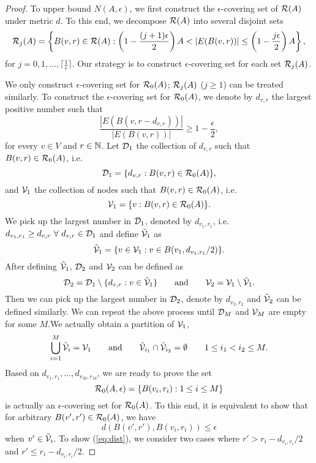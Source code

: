 \begin{proof}
	To upper bound $N(A,\epsilon)$, we first construct the $\epsilon$-covering set of $\mathcal{R}(A)$ under metric $d$.
	To this end, we decompose $\mathcal{R}(A)$ into several disjoint sets 
	$$
	\cR_j(A)=\left\{B(v,r)\in \cR(A): \left(1-\frac{(j+1)\epsilon}{2}\right)A<|E(B(v,r))|\le \left(1-\frac{j\epsilon}{2}\right)A\right\} ,
	$$
	for $j=0,1,\ldots, \lceil\frac{1}{\epsilon}\rceil$. Our strategy is to construct $\epsilon$-covering set for each set $\mathcal{R}_j(A)$. 
	
	We only construct $\epsilon$-covering set for $\mathcal{R}_0(A)$; $\mathcal{R}_j(A)$ ($j\ge 1$) can be treated similarly.
	To construct the $\epsilon$-covering set for $\mathcal{R}_0(A)$, we denote by $d_{v,r}$ the largest positive number such that
	\begin{equation}
	\label{eq:d}
	\frac{|E(B(v,r-d_{v,r}))|}{|E(B(v,r))|}\ge 1-\frac{\epsilon}{2},
	\end{equation}
	for every $v\in V$ and $r\in \mathbb{N}$. Let $\mathcal{D}_{1}$ the collection of $d_{v,r}$ such that $B(v,r)\in \mathcal{R}_0(A)$, i.e.
	$$
	\mathcal{D}_{1}=\{d_{v,r}:B(v,r)\in \mathcal{R}_0(A)\},
	$$
	and $\mathcal{V}_{1}$ the collection of nodes such that $B(v,r)\in \mathcal{R}_0(A)$, i.e. 
	$$
	\mathcal{V}_1=\{v:B(v,r)\in \mathcal{R}_0(A)\}.
	$$
	We pick up the largest number in $\mathcal{D}_1$, denoted by $d_{v_1,r_1}$, i.e. $
	d_{v_1,r_1}\ge d_{v,r}\ \forall\ d_{v,r}\in \cD_1$
	and define $\tilde{\mathcal{V}}_{1}$  as
	$$
	\tilde{\mathcal{V}}_{1}=\{v\in \mathcal{V}_1:v\in B(v_1,d_{v_1,r_1}/2)\}.
	$$
	After defining $\tilde{\mathcal{V}}_{1}$, $\mathcal{D}_{2}$ and $\mathcal{V}_2$ can be defined as
	$$
	\mathcal{D}_{2}=\mathcal{D}_{1}\setminus \{d_{v,r}:v\in \tilde{\mathcal{V}}_{1}\}\qquad{\rm and}\qquad \mathcal{V}_{2}=\mathcal{V}_{1}\setminus  \tilde{\mathcal{V}}_{1}.
	$$
	Then we can pick up the largest number in $\mathcal{D}_{2}$, denote by $d_{v_2,r_2}$ and $\tilde{\mathcal{V}}_{2}$ can be defined similarly.
	We can repeat the above process until $\mathcal{D}_M$ and $\mathcal{V}_M$ are empty for some $M$.We actually obtain a partition of $\mathcal{V}_1$, 
	$$
	\bigcup_{i=1}^{M}\tilde{\mathcal{V}}_i=\mathcal{V}_1\qquad{\rm and}\qquad \tilde{\mathcal{V}}_{i_1}\cap \tilde{\mathcal{V}}_{i_2}=\emptyset \qquad 1\le i_1< i_2\le M.
	$$
	Based on $d_{v_1,r_1},\ldots, d_{v_M,r_M}$, we are ready to prove the set
	$$
	\mathcal{R}_0(A,\epsilon)=\{B(v_i,r_i):1\le i\le M\}
	$$
	is actually an $\epsilon$-covering set for $\mathcal{R}_0(A)$. To this end, it is equivalent to show that for arbitrary $B(v',r')\in \mathcal{R}_0(A)$, we have
	\begin{equation}
	\label{eq:dist}
	d(B(v',r'),B(v_i,r_i))\le \epsilon
	\end{equation}
	when $v'\in \tilde{\mathcal{V}}_i$. To show (\ref{eq:dist}), we consider two cases where $r'>r_i-d_{v_i,r_i}/2$ and $r'\le r_i-d_{v_i,r_i}/2$.

\end{proof}
